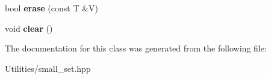 \begin{DoxyCompactItemize}
\item 
\hypertarget{classutil_1_1small__set_ad31c0177c932a2d8314c1dc9dc14ee83}{bool {\bfseries erase} (const T \&V)}\label{classutil_1_1small__set_ad31c0177c932a2d8314c1dc9dc14ee83}

\item 
\hypertarget{classutil_1_1small__set_a3bd13cf838f5bd847204f59d7c3150bb}{void {\bfseries clear} ()}\label{classutil_1_1small__set_a3bd13cf838f5bd847204f59d7c3150bb}

\end{DoxyCompactItemize}


The documentation for this class was generated from the following file\+:\begin{DoxyCompactItemize}
\item 
Utilities/small\+\_\+set.\+hpp\end{DoxyCompactItemize}
